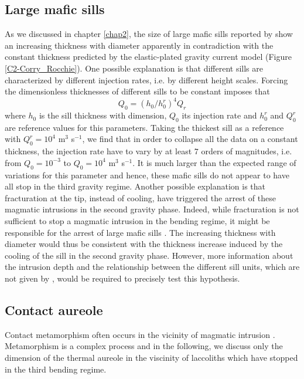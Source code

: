 \subsection{Large mafic sills}
\label{sec:large-mafic-sill}

As we discussed in chapter \ref{chap2},  the size of large mafic sills
reported  by  \citet{Cruden:tg}  show  an  increasing  thickness  with
diameter  apparently  in  contradiction with  the  constant  thickness
predicted  by   the  elastic-plated  gravity  current   model  (Figure
\ref{C2-Corry_Rocchie}).  One  possible explanation is  that different
sills  are  characterized  by  different  injection  rates,  i.e.   by
different  height scales.   Forcing the  dimensionless thicknesses  of
different sills to be constant imposes that
\begin{equation}
  Q_0 = (h_0/h_0^r)^4Q_r
\end{equation}
where $h_0$ is the sill  thickness with dimension, $Q_0$ its injection
rate and $h_0^r$ and $Q_0^r$ are reference values for this parameters.
Taking the  thickest sill  as a  reference with  $Q_0^r =  10^4$ m$^3$
s$^{-1}$, we find that in order to collapse all the data on a constant
thickness, the injection  rate have to vary by at  least $7$ orders of
magnitudes,   i.e.   from   $Q_0=10^{-3}$  to   $Q_0=  10^{4}$   m$^3$
s$^{-1}$. It is much larger than  the expected range of variations for
this parameter and hence, these mafic  sills do not appear to have all
stop in the third gravity regime. Another possible explanation is that
fracturation at the tip, instead of cooling, have triggered the arrest
of these  magmatic intrusions  in the  second gravity  phase.  Indeed,
while fracturation is  not sufficient to stop a  magmatic intrusion in
the bending  regime, it might be  responsible for the arrest  of large
mafic  sills \citep{Michaut:2011kg}.   The  increasing thickness  with
diameter would thus be consistent  with the thickness increase induced
by the cooling of the sill in the second gravity phase.  However, more
information about the intrusion depth and the relationship between the
different sill units, which are  not given by \citet{Cruden:tg}, would
be required to precisely test this hypothesis.

\subsection{Contact aureole}
\label{sec:thermal-aureol}

Contact  metamorphism  often  occurs   in  the  vicinity  of  magmatic
intrusion
\citep{Jaeger:1959du,SILLITOE:1998bs,Senger:2014tt}. Metamorphism is a
complex process and in the following, we discuss only the dimension of
the thermal aureole in the  viscinity of laccoliths which have stopped
in the third bending regime.


